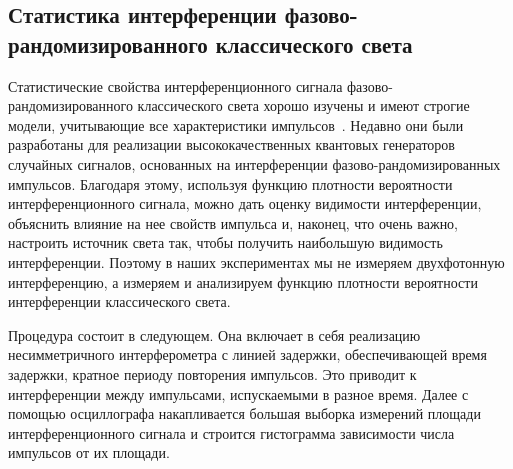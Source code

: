 
\subsection{Статистика интерференции фазово-рандомизированного классического света}

Статистические свойства интерференционного сигнала фазово-рандомизированного классического света хорошо изучены и имеют строгие модели, учитывающие все характеристики импульсов~\cite{shakhovoy2020, shakhovoy2021}. Недавно они были разработаны для реализации высококачественных квантовых генераторов случайных сигналов, основанных на интерференции фазово-рандомизированных импульсов. Благодаря этому, используя функцию плотности вероятности интерференционного сигнала, можно дать оценку видимости интерференции, объяснить влияние на нее свойств импульса и, наконец, что очень важно, настроить источник света так, чтобы получить наибольшую видимость интерференции. Поэтому в наших экспериментах мы не измеряем двухфотонную интерференцию, а измеряем и анализируем функцию плотности вероятности интерференции классического света. 

Процедура состоит в следующем. Она включает в себя реализацию несимметричного интерферометра с линией задержки, обеспечивающей время задержки, кратное периоду повторения импульсов. Это приводит к интерференции между импульсами, испускаемыми в разное время. Далее с помощью осциллографа накапливается большая выборка измерений площади интерференционного сигнала и строится гистограмма зависимости числа импульсов от их площади.

